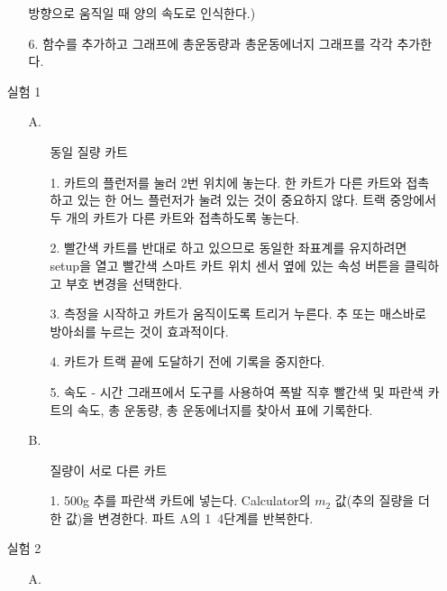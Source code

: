 \documentclass[12pt,a4paper]{article}
\begin{document}
\begin{enumerate}
\begin{enumerate}
                방향으로 움직일 때 양의 속도로 인식한다.)
            \item [6.] 함수를 추가하고 그래프에 총운동량과 총운동에너지 그래프를
                각각 추가한다.
        \end{enumerate}
    \item [실험 1]
        \begin{enumerate}
            \item [A.] 
                \begin{enumerate}
                    \item [] 동일 질량 카트
                    \item [1.] 카트의 플런저를 눌러 2번 위치에 놓는다. 한 카트가
                        다른 카트와 접촉하고 있는 한 어느 플런저가 눌려 있는 것이
                        중요하지 않다. 트랙 중앙에서 두 개의 카트가 다른 카트와
                        접촉하도록 놓는다.
                    \item [2.] 빨간색 카트를 반대로 하고 있으므로 동일한 좌표계를
                        유지하려면 setup을 열고 빨간색 스마트 카트 위치 센서 옆에
                        있는 속성 버튼을 클릭하고 부호 변경을 선택한다.
                    \item [3.] 측정을 시작하고 카트가 움직이도록 트리거 누른다.
                        추 또는 매스바로 방아쇠를 누르는 것이 효과적이다.
                    \item [4.] 카트가 트랙 끝에 도달하기 전에 기록을 중지한다.
                    \item [5.] 속도 - 시간 그래프에서 도구를 사용하여 폭발 직후
                        빨간색 및 파란색 카트의 속도, 총 운동량, 총 운동에너지를
                        찾아서 표에 기록한다.
                \end{enumerate}
            \item [B.]
                \begin{enumerate}
                    \item [] 질량이 서로 다른 카트
                    \item [1.] 500g 추를 파란색 카트에 넣는다. Calculator의 $m_2$
                        값(추의 질량을 더한 값)을 변경한다. 파트 A의 1~4단계를
                        반복한다.
                \end{enumerate}
        \end{enumerate}
    \item [실험 2]
        \begin{enumerate}
            \item [A.] 

\end{enumerate}
\end{enumerate}
\end{document}
